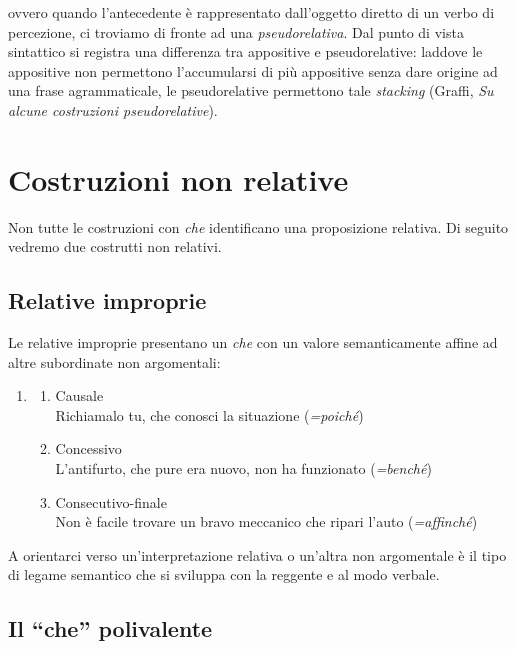 \documentclass[
  a4paper,
  twoside,
  11pt,
  chapterprefix=false,
  bibliography=totocnumbered,
  listof=flat]{scrbook}
\providecommand{\tightlist}{%
  \setlength{\itemsep}{0pt}\setlength{\parskip}{0pt}}
\begin{document}
ovvero quando l'antecedente è rappresentato dall'oggetto diretto di un verbo di percezione, ci troviamo di fronte ad una \emph{pseudorelativa}.
Dal punto di vista sintattico si registra una differenza tra appositive e pseudorelative: laddove le appositive non permettono l'accumularsi di più appositive senza dare origine ad una frase agrammaticale, le pseudorelative permettono tale \emph{stacking} (Graffi, \emph{Su alcune costruzioni pseudorelative}).

\hypertarget{costruzioni-non-relative}{%
\section{Costruzioni non relative}\label{costruzioni-non-relative}}

Non tutte le costruzioni con \emph{che} identificano una proposizione relativa. Di seguito vedremo due costrutti non relativi.

\hypertarget{relative-improprie}{%
\subsection{Relative improprie}\label{relative-improprie}}

Le relative improprie presentano un \emph{che} con un valore semanticamente affine ad altre subordinate non argomentali:

\begin{enumerate}
\def\labelenumi{(\arabic{enumi})}
\setcounter{enumi}{145}
\item
  \begin{enumerate}
  \def\labelenumii{\alph{enumii}.}
  \tightlist
  \item
    Causale\\
    Richiamalo tu, che conosci la situazione (\emph{=poiché})
  \item
    Concessivo\\
    L'antifurto, che pure era nuovo, non ha funzionato (\emph{=benché})
  \item
    Consecutivo-finale\\
    Non è facile trovare un bravo meccanico che ripari l'auto (\emph{=affinché})
  \end{enumerate}
\end{enumerate}

A orientarci verso un'interpretazione relativa o un'altra non argomentale è il tipo di legame semantico che si sviluppa con la reggente e al modo verbale.

\hypertarget{il-che-polivalente}{%
\subsection{\texorpdfstring{Il \enquote{che} polivalente}{Il ``che'' polivalente}}\label{il-che-polivalente}}
\end{document}
